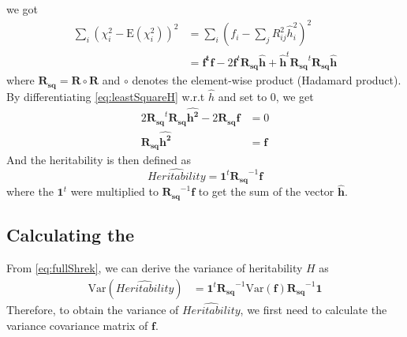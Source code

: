 			we got
			\begin{align}
			\sum_i(\chi_i^2-\mathrm{E}(\chi_i^2))^2&=\sum_i(f_i-\sum_j{R^2_{ij}\hat{h}_i^2})^2 \nonumber\\
			&=\boldsymbol{f^tf}-2\boldsymbol{f}^t\boldsymbol{R_{sq}\hat{h}}+\boldsymbol{\hat{h}}^t\boldsymbol{R_{sq}}^t\boldsymbol{R_{sq}\hat{h}}
			\label{eq:leastSquareH}
			\end{align}
			where $\boldsymbol{R_{sq}} = \boldsymbol{R}\circ\boldsymbol{R}$ and $\circ$ denotes the element-wise product (Hadamard product).
			By differentiating \cref{eq:leastSquareH} w.r.t $\hat{h}$ and set to 0, we get
			\begin{align}
				2\boldsymbol{R_{sq}}^t\boldsymbol{R_{sq}}\boldsymbol{\hat{h^2}}-2\boldsymbol{R_{sq}f}&=0 \nonumber\\
				\boldsymbol{R_{sq}}\boldsymbol{\hat{h^2}} &=\boldsymbol{f}
				\label{eq:shrekEq}
			\end{align}
			And the heritability is then defined as 
			\begin{equation}
			\hat{Heritability} = \boldsymbol{1}^t\boldsymbol{R_{sq}}^{-1}\boldsymbol{f}
			\label{eq:fullShrek}
			\end{equation}
			where the $\boldsymbol{1}^t$ were multiplied to $\boldsymbol{R_{sq}}^{-1}\boldsymbol{f}$ to get the sum of the vector $\hat{\boldsymbol{h}}$.
			
		\subsection{Calculating the }
			From \cref{eq:fullShrek}, we can derive the variance of heritability $H$ as 
			\begin{align}
				\mathrm{Var}(\hat{Heritability})
				&=\boldsymbol{1}^t\boldsymbol{R_{sq}}^{-1}\mathrm{Var}(\boldsymbol{f})\boldsymbol{R_{sq}}^{-1}\boldsymbol{1}
				\label{eq:varHvarf}
			\end{align}
			Therefore, to obtain the variance of $\hat{Heritability}$, we first need to calculate the variance covariance matrix of $\boldsymbol{f}$.
			
